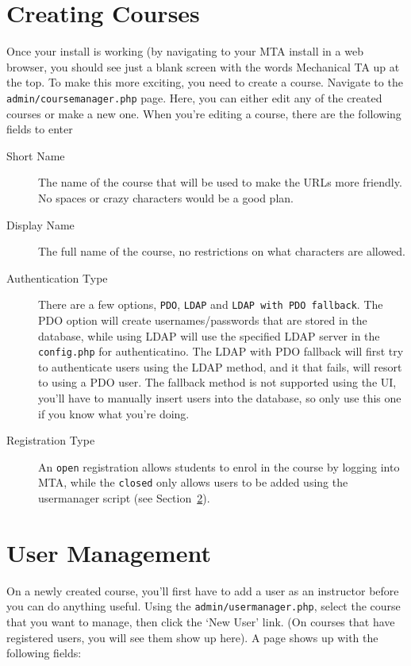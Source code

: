 \documentclass[11pt,letterpaper,oneside]{article}
\begin{document}
\section{Creating Courses}

Once your install is working (by navigating to your MTA install in a web browser, you should see just a blank screen with the words Mechanical TA up at the top. To make this more exciting, you need to create a course. Navigate to the \texttt{admin/coursemanager.php} page. Here, you can either edit any of the created courses or make a new one. When you're editing a course,  there are the following fields to enter

\begin{description}
  \item [Short Name] The name of the course that will be used to make the URLs more friendly. No spaces or crazy characters would be a good plan.
  \item [Display Name] The full name of the course, no restrictions on what characters are allowed.
  \item [Authentication Type] There are a few options,  \texttt{PDO},  \texttt{LDAP} and \texttt{LDAP with PDO fallback}. The PDO option will create usernames/passwords that are stored in the database, while using LDAP will use the specified LDAP server in the \texttt{config.php} for authenticatino. The LDAP with PDO fallback will first try to authenticate users using the LDAP method, and it that fails, will resort to using a PDO user. The fallback method is not supported using the UI, you'll have to manually insert users into the database, so only use this one if you know what you're doing.
  \item [Registration Type] An \texttt{open} registration allows students to enrol in the course by logging into MTA, while the \texttt{closed} only allows users to be added using the usermanager script (see Section~\ref{users}).
\end{description}

\section{User Management}\label{users}

On a newly created course,  you'll first have to add a user as an instructor before you can do anything useful. Using the \texttt{admin/usermanager.php},  select the course that you want to manage, then click the `New User' link. (On courses that have registered users,  you will see them show up here). A page shows up with the following fields:
\end{document}
